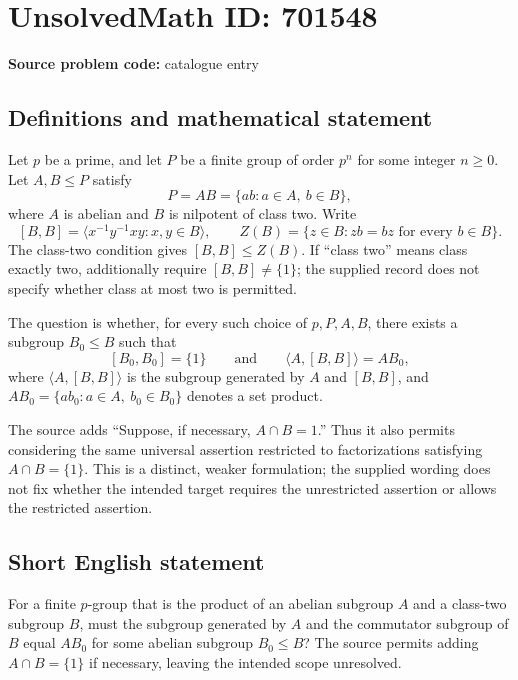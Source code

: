 \documentclass[11pt]{article}
\begin{document}
\section*{UnsolvedMath ID: 701548}
\textbf{Source problem code:} catalogue entry
\subsection{Definitions and mathematical statement}
Let \(p\) be a prime, and let \(P\) be a finite group of order \(p^n\) for some integer \(n\geq 0\). Let \(A,B\leq P\) satisfy
\[
P=AB=\{ab:a\in A,\ b\in B\},
\]
where \(A\) is abelian and \(B\) is nilpotent of class two. Write
\[
[B,B]=\langle x^{-1}y^{-1}xy:x,y\in B\rangle,
\qquad
Z(B)=\{z\in B:zb=bz\text{ for every }b\in B\}.
\]
The class-two condition gives \([B,B]\leq Z(B)\). If ``class two'' means class exactly two, additionally require \([B,B]\neq\{1\}\); the supplied record does not specify whether class at most two is permitted.

The question is whether, for every such choice of \(p,P,A,B\), there exists a subgroup \(B_0\leq B\) such that
\[
[B_0,B_0]=\{1\}
\qquad\text{and}\qquad
\langle A,[B,B]\rangle=AB_0,
\]
where \(\langle A,[B,B]\rangle\) is the subgroup generated by \(A\) and \([B,B]\), and \(AB_0=\{ab_0:a\in A,\ b_0\in B_0\}\) denotes a set product.

The source adds ``Suppose, if necessary, \(A\cap B=1\).'' Thus it also permits considering the same universal assertion restricted to factorizations satisfying \(A\cap B=\{1\}\). This is a distinct, weaker formulation; the supplied wording does not fix whether the intended target requires the unrestricted assertion or allows the restricted assertion.
\subsection{Short English statement}
For a finite \(p\)-group that is the product of an abelian subgroup \(A\) and a class-two subgroup \(B\), must the subgroup generated by \(A\) and the commutator subgroup of \(B\) equal \(AB_0\) for some abelian subgroup \(B_0\leq B\)? The source permits adding \(A\cap B=\{1\}\) if necessary, leaving the intended scope unresolved.
\end{document}
